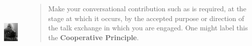 \documentclass[compress]{beamer}
\begin{document}


\begin{frame}
\frametitle{\cite{grice:1975}}
\begin{columns}[T]  
   \begin{column}{.25\textwidth}
	  \vspace{10pt}
	  \includegraphics[height=1.2in]{grice.jpg}   
   \end{column}
   \begin{column}{.7\textwidth}
      \begin{block}{}
      \begin{quote}
	   Make your conversational contribution  such as is required, at the stage at which it occurs, by the accepted purpose or direction of the talk exchange in which you are engaged. One might label this the \textbf{Cooperative Principle}.
      \end{quote}           
      \end{block}
    \end{column}
  \end{columns}
\end{frame}
\end{document}
